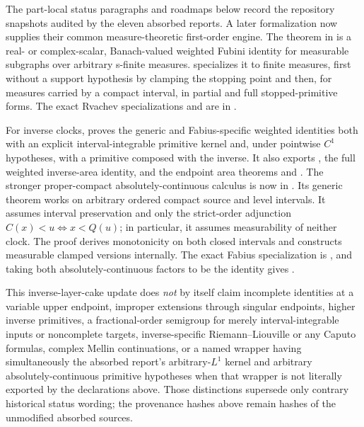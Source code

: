 \documentclass[11pt,oneside]{article}
\theoremstyle{definition}
\theoremstyle{remark}
\newcommand{\1}{\mathbf 1}
\begin{document}
\begin{statusbox}
The part-local status paragraphs and roadmaps below record the repository snapshots audited
by the eleven absorbed reports.  A later formalization now supplies their common
measure-theoretic first-order engine.  The theorem
 in
 is a real- or complex-scalar, Banach-valued weighted Fubini
identity for measurable subgraphs over arbitrary s-finite measures.
 specializes it to finite measures, first without a support
hypothesis by clamping the stopping point and then, for measures carried by a compact
interval, in partial and full stopped-primitive forms.  The exact Rvachev specializations
and
are in .

For inverse clocks,  proves the generic and Fabius-specific
weighted identities both with an explicit interval-integrable primitive kernel and, under
pointwise \(C^1\) hypotheses, with a primitive composed with the inverse.  It also exports
, the full weighted inverse-area identity,
and the endpoint area theorems
 and
.
The stronger proper-compact absolutely-continuous calculus is now in
.  Its generic theorem
works on arbitrary ordered compact source and level intervals.  It assumes interval
preservation and only the strict-order adjunction
\(C(x)<u\Longleftrightarrow x<Q(u)\); in particular, it assumes measurability of neither
clock.  The proof derives monotonicity on both closed intervals and constructs measurable
clamped  versions internally.  The exact Fabius specialization is
, and taking
both absolutely-continuous factors to be the identity gives
.

This inverse-layer-cake update does \emph{not} by itself claim incomplete identities at a variable upper endpoint,
improper extensions through singular endpoints, higher inverse primitives, a
fractional-order semigroup for merely interval-integrable inputs or noncomplete targets,
inverse-specific Riemann--Liouville or any Caputo
formulas, complex Mellin continuations, or a named wrapper having simultaneously the
absorbed report's arbitrary-\(L^1\) kernel and arbitrary absolutely-continuous primitive
hypotheses when that wrapper is not literally exported by the declarations above.  Those
distinctions supersede only contrary historical status wording; the provenance hashes
above remain hashes of the unmodified absorbed sources.
\end{statusbox}
\end{document}
